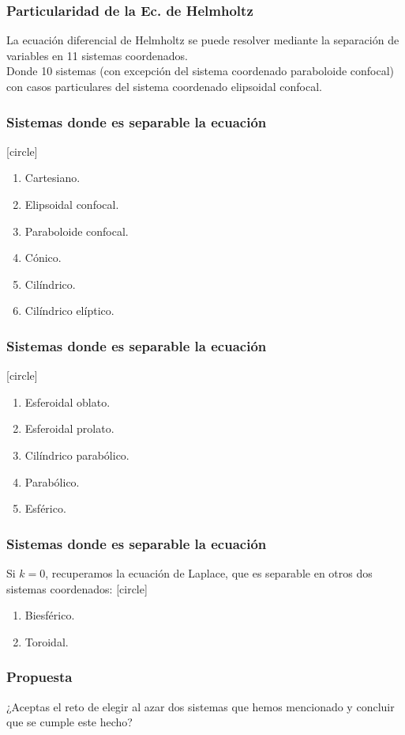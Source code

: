 \documentclass[12pt]{beamer}
\begin{document}
\begin{frame}
\frametitle{Particularidad de la Ec. de Helmholtz}
La ecuación diferencial de Helmholtz se puede resolver mediante la separación de variables en 11 sistemas coordenados.
\\
\bigskip
\pause
Donde 10 sistemas (con excepción del sistema coordenado paraboloide confocal) con casos particulares del sistema coordenado elipsoidal confocal.
\end{frame}
\begin{frame}
\frametitle{Sistemas donde es separable la ecuación}
[circle]
\begin{enumerate}[<+->]
\item Cartesiano.
\item Elipsoidal confocal.
\item Paraboloide confocal.
\item Cónico.
\item Cilíndrico.
\item Cilíndrico elíptico.
\seti
\end{enumerate}
\end{frame}
\begin{frame}
\frametitle{Sistemas donde es separable la ecuación}
[circle]
\begin{enumerate}[<+->]
\conti    
\item Esferoidal oblato.
\item Esferoidal prolato.
\item Cilíndrico parabólico.
\item Parabólico.
\item Esférico.
\end{enumerate}
\end{frame}
\begin{frame}
\frametitle{Sistemas donde es separable la ecuación}
Si $k = 0$, recuperamos la ecuación de Laplace, que es separable en otros dos sistemas coordenados:
[circle]
\begin{enumerate}[<+->]
\item Biesférico.
\item Toroidal.
\end{enumerate}
\end{frame}
\begin{frame}
\frametitle{Propuesta}
¿Aceptas el reto de elegir al azar dos sistemas que hemos mencionado y concluir que se cumple este hecho?
\end{frame}
\end{document}

